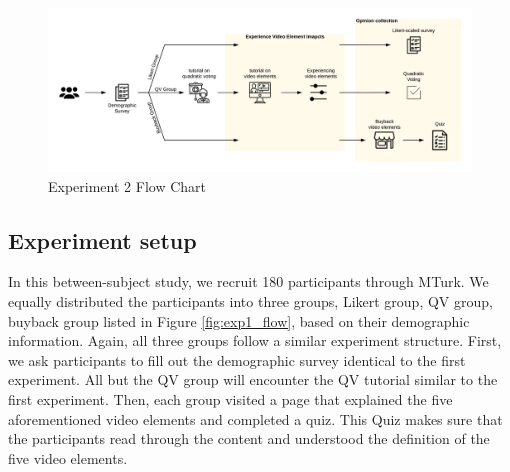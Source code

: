 
\begin{figure}[htpb]
    \centering
    \includegraphics[width=\textwidth, keepaspectratio=true]{content/image/exp2_flow.png}
    \caption{
        Experiment 2 Flow Chart
    }
    \label{fig:exp2_flow}
\end{figure}

\subsection{Experiment setup}
In this between-subject study, we recruit 180 participants through MTurk.
We equally distributed the participants into three groups, Likert group, QV group, buyback group listed in Figure \ref{fig:exp1_flow}, based on their demographic information.
Again, all three groups follow a similar experiment structure.
First, we ask participants to fill out the demographic survey identical to the first experiment.
All but the QV group will encounter the QV tutorial similar to the first experiment.
Then, each group visited a page that explained the five aforementioned video elements and completed a quiz.
This Quiz makes sure that the participants read through the content and understood the definition of the five video elements.

